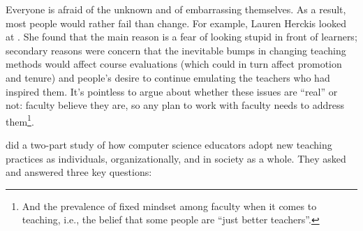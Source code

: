 Everyone is afraid of the unknown and of embarrassing themselves.
As a result,
most people would rather fail than change.
For example,
Lauren Herckis looked at
.
She found that the main reason is a fear of looking stupid in front of learners;
secondary reasons were
concern that the inevitable bumps in changing teaching methods would affect course evaluations
(which could in turn affect promotion and tenure)
and people's desire to continue emulating the teachers who had inspired them.
It's pointless to argue about whether these issues are ``real'' or not:
faculty believe they are,
so any plan to work with faculty needs to address them\footnote{
  And the prevalence of fixed mindset among faculty when it comes to teaching,
  i.e.,
  the belief that some people are ``just better teachers''.
}.

\cite{Bark2015} did a two-part study of how computer science educators adopt new teaching practices
as individuals, organizationally, and in society as a whole.
They asked and answered three key questions:

